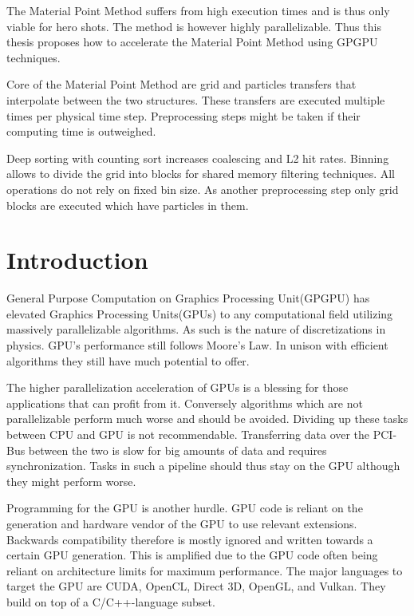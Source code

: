 \documentclass[m,times]{cgMA}
\begin{document}
\noindent The Material Point Method suffers from high execution times and is thus only viable for hero shots. The method is however highly parallelizable. Thus this thesis proposes how to accelerate the Material Point Method using GPGPU techniques.

\noindent Core of the Material Point Method are grid and particles transfers that interpolate between the two structures. These transfers are executed multiple times per physical time step. Preprocessing steps might be taken if their computing time is outweighed.

\noindent Deep sorting with counting sort increases coalescing and L2 hit rates. Binning allows to divide the grid into blocks for shared memory filtering techniques. All operations do not rely on fixed bin size. As another preprocessing step only grid blocks are executed which have particles in them.
\vfill
\clearpage
\tableofcontents

\clearpage         %
{}


\section{Introduction} \label{intro}
General Purpose Computation on Graphics Processing Unit(GPGPU) has elevated Graphics Processing Units(GPUs) to any computational field utilizing massively parallelizable algorithms. As such is the nature of discretizations in physics. GPU's performance still follows Moore's Law. In unison with efficient algorithms they still have much potential to offer.

The higher parallelization acceleration of GPUs is a blessing for those applications that can profit from it. Conversely algorithms which are not parallelizable perform much worse and should be avoided. Dividing up these tasks between CPU and GPU is not recommendable. Transferring data over the PCI-Bus between the two is slow for big amounts of data and requires synchronization. Tasks in such a pipeline should thus stay on the GPU although they might perform worse.

Programming for the GPU is another hurdle. GPU code is reliant on the generation and hardware vendor of the GPU to use relevant extensions. Backwards compatibility therefore is mostly ignored and written towards a certain GPU generation. This is amplified due to the GPU code often being reliant on architecture limits for maximum performance. The major languages to target the GPU are CUDA, OpenCL, Direct 3D, OpenGL, and Vulkan. They build on top of a C/C++-language subset.
\end{document}
